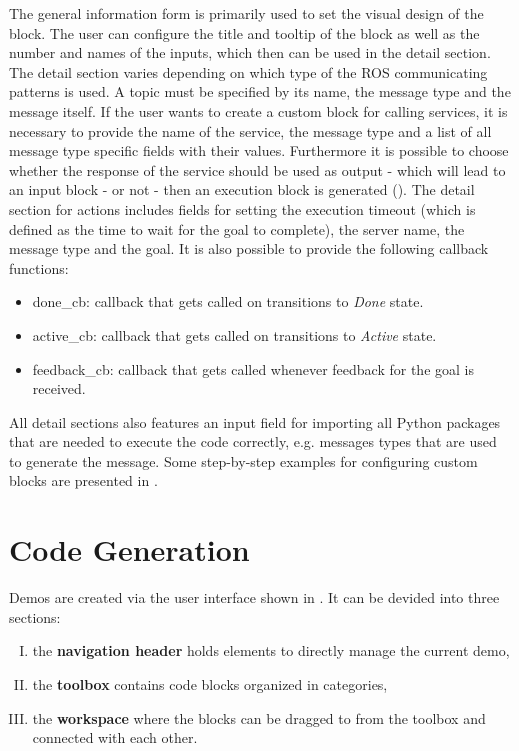 The general information form is primarily used to set the visual design of the block. The user can configure the title and tooltip of the block as well as the number and names of the inputs, which then can be used in the detail section. The detail section varies depending on which type of the ROS communicating patterns is used. A topic must be specified by its name, the message type and the message itself. If the user wants to create a custom block for calling services, it is necessary to provide the name of the service, the message type and a list of all message type specific fields with their values. Furthermore it is possible to choose whether the response of the service should be used as output - which will lead to an input block - or not - then an execution block is generated (). The detail section for actions includes fields for setting the execution timeout (which is defined as the time to wait for the goal to complete), the server name, the message type and the goal. It is also possible to provide the following callback functions:

\begin{itemize}
	\item done\_cb: callback that gets called on transitions to  \textit{Done} state.
	\item active\_cb: callback that gets called on transitions to  \textit{Active} state.
	\item feedback\_cb: callback that gets called whenever feedback for the goal is received.
\end{itemize}

All detail sections also features an input field for importing all Python packages that are needed to execute the code correctly, e.g. messages types that are used to generate the message. Some step-by-step examples for configuring custom blocks are presented in .

\section{Code Generation} \label{sec:CodeGeneration}
Demos are created via the user interface shown in . It can be devided into three sections:

\begin{enumerate}[I.]
	\item the \textbf{navigation header} holds elements to directly manage the current demo,
	\item the \textbf{toolbox} contains code blocks organized in categories,
	\item the \textbf{workspace} where the blocks can be dragged to from the toolbox and connected with each other.
\end{enumerate}

